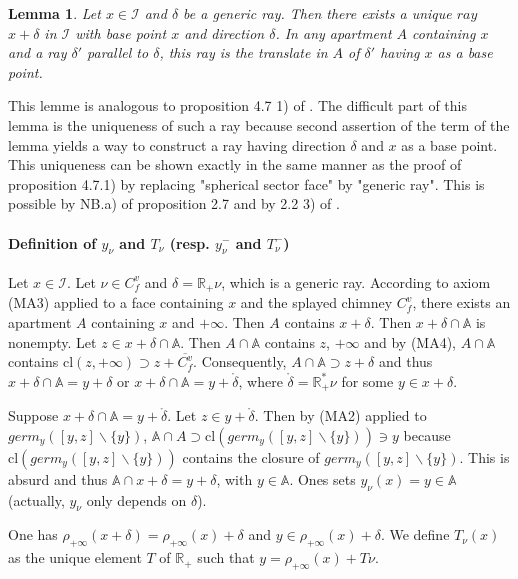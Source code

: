 \documentclass[12pt]{article}
\theoremstyle{plain}
\newtheorem{lemme}[thm]{Lemma}
\theoremstyle{definition}
\newcommand{\R}{\mathbb{R}}
\newcommand{\A}{\mathbb{A}}
\newcommand{\I}{\mathcal{I}}
\begin{document}
\begin{lemme}\label{lemme demi-droite de base donnée}
Let $x\in \I$ and $\delta$ be a generic ray. Then there exists a unique $ray$ $x+\delta$ in $\I$ with base point $x$ and direction $\delta$. In any apartment $A$ containing $x$ and a ray $\delta'$ parallel to $\delta$, this ray is the translate in $A$ of $\delta'$ having $x$ as a base point.
\end{lemme}

This lemme is analogous to proposition 4.7 1) of \cite{rousseau2011masures}. The difficult part of this lemma is the uniqueness of such a ray because second assertion of the term of the lemma yields a way to construct a ray having direction $\delta$ and $x$ as a base point. This uniqueness can be shown exactly in the same manner as the proof of proposition 4.7.1) by replacing "spherical sector face" by "generic ray". This is possible by NB.a) of proposition 2.7 and by 2.2 3) of \cite{rousseau2011masures}.


\paragraph{Definition of $y_\nu$ and $T_\nu$ (resp. $y^-_\nu$ and $T^-_\nu$)}
Let $x\in \mathcal{I}$. Let $\nu \in C_f^v$ and $\delta=\R_+\nu$, which is a generic ray. According to axiom (MA3) applied to a face containing $x$ and the splayed chimney $C^v_f$, there exists an apartment $A$ containing $x$ and $+\infty$. Then $A$ contains $x+\delta$. Then $x+\delta\cap \A$ is nonempty. Let $z\in x+\delta\cap \A$. Then $A\cap \A$ contains $z$, $+\infty$ and by (MA4), $A\cap\A$ contains $\mathrm{cl}(z,+\infty)\supset z+\overline{C_f^v}$. Consequently, $A\cap\A \supset z+\delta$ and thus $x+\delta\cap \A=y+\delta$ or $x+\delta\cap \A=y+\mathring{\delta}$, where $\mathring \delta=\R^*_+\nu$ for some $y\in x+\delta$.

 Suppose $x+\delta\cap \A=y+\mathring{\delta}$. Let $z\in y+\mathring{\delta}$. Then by (MA2) applied to $germ_y([y,z]\backslash\{y\})$, $\A\cap A\supset \mathrm{cl}(germ_y([y,z]\backslash\{y\}))\ni y$ because $\mathrm{cl}(germ_y([y,z]\backslash\{y\}))$ contains the closure of $germ_y([y,z]\backslash\{y\})$. This is absurd and thus $\A\cap x+\delta=y+\delta$, with $y\in \A$. Ones sets $y_\nu(x)=y\in\A$ (actually, $y_\nu$ only depends on $\delta$).

One has $\rho_{+\infty}(x+\delta)=\rho_{+\infty}(x)+\delta$ and $y\in \rho_{+\infty}(x)+\delta$. We define $T_\nu(x)$ as the unique element $T$ of $\mathbb{R}_+$ such that $y=\rho_{+\infty}(x)+T\nu$.
\end{document}
